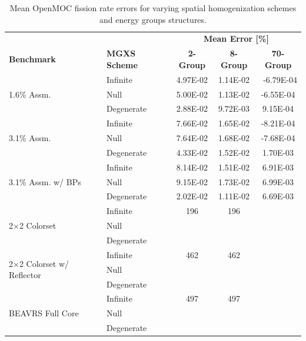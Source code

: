 \begin{table}[h!]
  \centering
  \caption[Mean OpenMOC fission rate errors]{Mean OpenMOC fission rate errors for varying spatial homogenization schemes and energy groups structures.}
  \small
  \label{table:chap8-openmoc-mean-fiss-rates}
  \vspace{6pt}
  \begin{tabular}{l l c c c}
  \toprule
  \rowcolor{lightgray}
  & & \multicolumn{3}{c}{\cellcolor{lightgray} \textbf{Mean Error [\%]}} \\
  \multirow{-2}{*}{\cellcolor{lightgray} \bf Benchmark} &
  \multirow{-2}{*}{\cellcolor{lightgray} \bf \ac{MGXS} Scheme} &
  {\cellcolor{lightgray} \bf 2-Group} &
  {\cellcolor{lightgray} \bf 8-Group} &
  {\cellcolor{lightgray} \bf 70-Group} \\
  \midrule
\multirow{3}{*}{\parbox{2.5cm}{1.6\% Assm.}} & Infinite & 4.97E-02 & 1.14E-02 &\
 -6.79E-04 \\
& Null & 5.00E-02 & 1.13E-02 & -6.55E-04 \\
& Degenerate & 2.88E-02 & 9.72E-03 & 9.15E-04 \\
  \midrule
\multirow{3}{*}{\parbox{2.5cm}{3.1\% Assm.}} & Infinite & 7.66E-02 & 1.65E-02 & -8.21E-04 \\
& Null & 7.64E-02 & 1.68E-02 & -7.68E-04 \\
& Degenerate & 4.33E-02 & 1.52E-02 & 1.70E-03 \\
  \midrule
\multirow{3}{*}{\parbox{2.5cm}{3.1\% Assm. w/ \acp{BP}}} & Infinite & 8.14E-02 & 1.51E-02 & 6.91E-03 \\
& Null & 9.15E-02 & 1.73E-02 & 6.99E-03 \\
& Degenerate & 2.02E-02 & 1.11E-02 & 6.69E-03 \\
  \midrule
  \multirow{3}{*}{\parbox{2.5cm}{2$\times$2 Colorset}} & Infinite & 196 & 196 & \\
  & Null & & & \\
  & Degenerate & & & \\
  \midrule
  \multirow{3}{*}{\parbox{2.3cm}{2$\times$2 Colorset w/ Reflector}} & Infinite & 462 & 462 & \\
  & Null & & & \\
  & Degenerate & & & \\
  \midrule
  \multirow{3}{*}{\parbox{2cm}{\ac{BEAVRS} Full Core}} & Infinite & 497 & 497 & \\
  & Null & & & \\
  & Degenerate & & & \\
  \bottomrule
\end{tabular}
\end{table}

